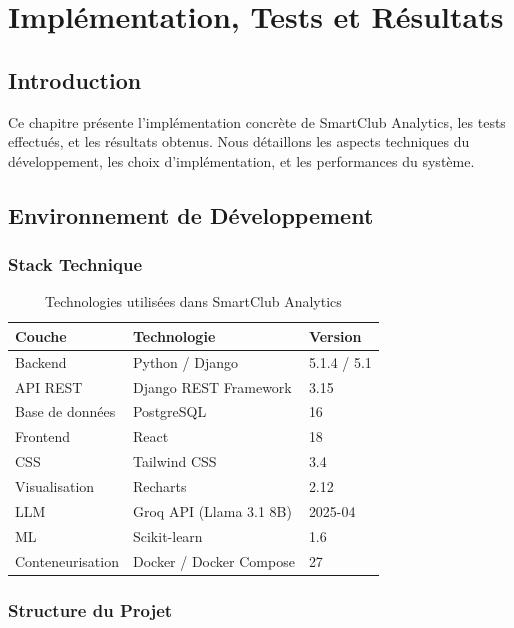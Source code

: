 \chapter{Implémentation, Tests et Résultats}

\section{Introduction}

Ce chapitre présente l'implémentation concrète de SmartClub Analytics, les tests effectués, et les résultats obtenus. Nous détaillons les aspects techniques du développement, les choix d'implémentation, et les performances du système.

\section{Environnement de Développement}

\subsection{Stack Technique}

\begin{table}[H]
\centering
\begin{tabular}{|l|l|l|}
\hline
\textbf{Couche} & \textbf{Technologie} & \textbf{Version} \\
\hline
Backend & Python / Django & 5.1.4 / 5.1 \\
API REST & Django REST Framework & 3.15 \\
Base de données & PostgreSQL & 16 \\
Frontend & React & 18 \\
CSS & Tailwind CSS & 3.4 \\
Visualisation & Recharts & 2.12 \\
LLM & Groq API (Llama 3.1 8B) & 2025-04 \\
ML & Scikit-learn & 1.6 \\
Conteneurisation & Docker / Docker Compose & 27 \\
\hline
\end{tabular}
\caption{Technologies utilisées dans SmartClub Analytics}
\label{tab:tech-stack}
\end{table}

\subsection{Structure du Projet}

